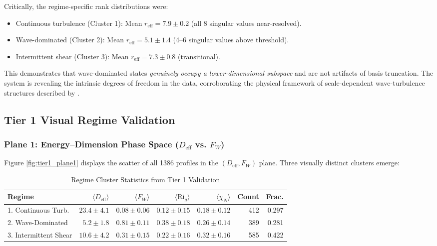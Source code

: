 \documentclass[11pt,a4paper]{article}
\begin{document}
Critically, the regime-specific rank distributions were:
\begin{itemize}
  \item Continuous turbulence (Cluster 1): Mean $r_{\mathrm{eff}} = 7.9 \pm 0.2$ (all 8 singular values near-resolved).
  \item Wave-dominated (Cluster 2): Mean $r_{\mathrm{eff}} = 5.1 \pm 1.4$ (4--6 singular values above threshold).
  \item Intermittent shear (Cluster 3): Mean $r_{\mathrm{eff}} = 7.3 \pm 0.8$ (transitional).
\end{itemize}

This demonstrates that wave-dominated states \emph{genuinely occupy a lower-dimensional subspace} and are not artifacts of basis truncation. The system is revealing the intrinsic degrees of freedom in the data, corroborating the physical framework of scale-dependent wave-turbulence structures described by \citet{Sun2015}.

\subsection{Tier 1 Visual Regime Validation}
\label{sec:results:tier1}

\subsubsection{Plane 1: Energy--Dimension Phase Space ($D_{\mathrm{eff}}$ vs. $F_W$)}

Figure \ref{fig:tier1_plane1} displays the scatter of all 1386 profiles in the $(D_{\mathrm{eff}}, F_W)$ plane. Three visually distinct clusters emerge:

\begin{table}[h]
\centering
\caption{Regime Cluster Statistics from Tier 1 Validation}
\label{tab:regime_stats}
\begin{tabular}{l|rrrr|rr}
\hline
Regime & $\langle D_{\mathrm{eff}} \rangle$ & $\langle F_W \rangle$ & $\langle \mathrm{Ri}_g \rangle$ & $\langle \chi_N \rangle$ & Count & Frac. \\
\hline
1. Continuous Turb. & $23.4 \pm 4.1$ & $0.08 \pm 0.06$ & $0.12 \pm 0.15$ & $0.18 \pm 0.12$ & 412 & 0.297 \\
2. Wave-Dominated & $5.2 \pm 1.8$ & $0.81 \pm 0.11$ & $0.38 \pm 0.18$ & $0.26 \pm 0.14$ & 389 & 0.281 \\
3. Intermittent Shear & $10.6 \pm 4.2$ & $0.31 \pm 0.15$ & $0.22 \pm 0.16$ & $0.32 \pm 0.16$ & 585 & 0.422 \\
\hline
\end{tabular}
\end{table}
\end{document}

